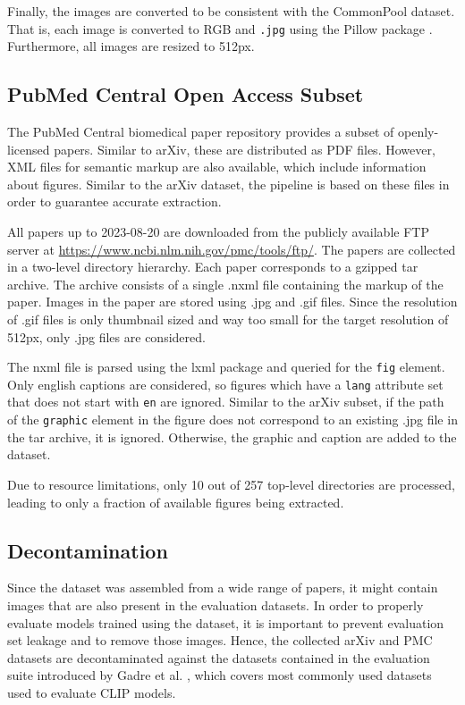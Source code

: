 Finally, the images are converted to be consistent with the CommonPool dataset. That is, each image is converted to RGB and \texttt{.jpg} using the Pillow package \cite{Pillow}. Furthermore, all images are resized to 512px.

\subsection{PubMed Central Open Access Subset}
\label{subsec:data.pmc}

The PubMed Central biomedical paper repository provides a subset of openly-licensed papers. Similar to arXiv, these are distributed as PDF files. However, XML files for semantic markup are also available, which include information about figures. Similar to the arXiv dataset, the pipeline is based on these files in order to guarantee accurate extraction.

All papers up to 2023-08-20 are downloaded from the publicly available FTP server at \url{https://www.ncbi.nlm.nih.gov/pmc/tools/ftp/}. The papers are collected in a two-level directory hierarchy. Each paper corresponds to a gzipped tar archive. The archive consists of a single .nxml file containing the markup of the paper. Images in the paper are stored using .jpg and .gif files. Since the resolution of .gif files is only thumbnail sized and way too small for the target resolution of 512px, only .jpg files are considered.

The nxml file is parsed using the lxml package \cite{lxml} and queried for the \texttt{fig} element. Only english captions are considered, so figures which have a \texttt{lang} attribute set that does not start with \texttt{en} are ignored. Similar to the arXiv subset, if the path of the \texttt{graphic} element in the figure does not correspond to an existing .jpg file in the tar archive, it is ignored. Otherwise, the graphic and caption are added to the dataset.

Due to resource limitations, only 10 out of 257 top-level directories are processed, leading to only a fraction of available figures being extracted.

\subsection{Decontamination}
\label{subsec:decontamination}
Since the dataset was assembled from a wide range of papers, it might contain images that are also present in the evaluation datasets. In order to properly evaluate models trained using the dataset, it is important to prevent evaluation set leakage and to remove those images. Hence, the collected arXiv and PMC datasets are decontaminated against the datasets contained in the evaluation suite introduced by Gadre et al. \cite{DBLP:journals/corr/abs-2304-14108}, which covers most commonly used datasets used to evaluate CLIP models.

